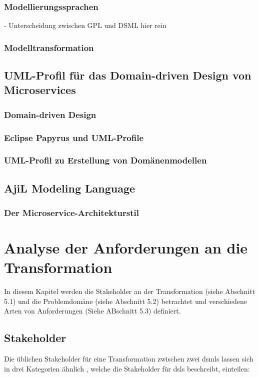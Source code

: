 \documentclass[
	oneside,  %
	ngerman, 
	final, 
	11pt, 
	a4paper, 
	1.1headlines, 
	headinclude=false, 
	footinclude=false, 
	mpinclude=false, 
	pagesize, 
	onecolumn, 
	titlepage, 
	parskip=half, 
	headsepline, 
	chapterprefix=false, 
	version=first, 
	listof=totoc, 
	bibliography=totoc, 
	toc=graduated, 
	fleqn
]{scrbook}
\begin{document}
\subsection{Modellierungssprachen}
- Unterscheidung zwischen GPL und DSML hier rein

\subsection{Modelltransformation}

\section{UML-Profil für das Domain-driven Design von Microservices}

\subsection{Domain-driven Design}
\subsection{Eclipse Papyrus und UML-Profile}
\subsection{UML-Profil zu Erstellung von Domänenmodellen}

\section{AjiL Modeling Language}
\subsection{Der Microservice-Architekturstil}

\chapter{Analyse der Anforderungen an die Transformation} %
In diesem Kapitel werden die Stakeholder an der Transformation (siehe Abschnitt 5.1) und die Problemdomäne (siehe Abschnitt 5.2) betrachtet und verschiedene Arten von Anforderungen (Siehe ABschnitt 5.3) definiert. %
\section{Stakeholder}
Die üblichen Stakeholder für eine Transformation zwischen zwei \ac{dsml}s lassen sich in drei Kategorien ähnlich \cite{DSMLReq}, welche die Stakeholder für \ac{dsl}s beschreibt, einteilen:
\end{document}
